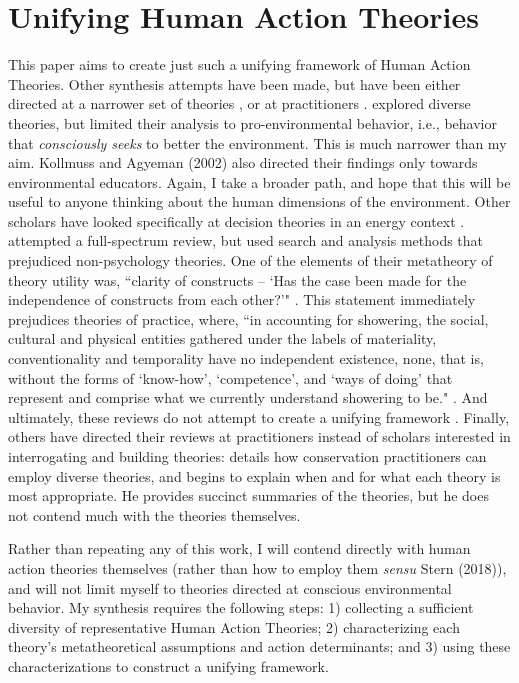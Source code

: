 \documentclass[12 pt]{article}
\begin{document}
\section{Unifying Human Action Theories}
This paper aims to create just such a unifying framework of Human Action Theories. Other synthesis attempts have been made, but have been either directed at a narrower set of theories \parencite[e.g.,][]{Kollmuss2002}, or at practitioners \parencite{Stern2018}. \textcite{Kollmuss2002} explored diverse theories, but limited their analysis to pro-environmental behavior, i.e., behavior that \textit{consciously seeks} to better the environment. This is much narrower than my aim. Kollmuss and Agyeman (2002) also directed their findings only towards environmental educators. Again, I take a broader path, and hope that this will be useful to anyone thinking about the human dimensions of the environment.  Other scholars have looked specifically at decision theories in an energy context \parencite{Wilson2007}.  \textcite{Davis2015} attempted a full-spectrum review, but used search and analysis methods that prejudiced  non-psychology theories. One of the elements of their metatheory of theory utility was, ``clarity of constructs – `Has the case been made for the independence of constructs from each other?'" \parencite[][p. 332]{Davis2015}. This statement immediately prejudices theories of practice, where, ``in accounting for showering, the social, cultural and physical entities gathered under the labels of materiality, conventionality and temporality have no independent existence, none, that is, without the forms of `know-how', `competence', and `ways of doing' that represent and comprise what we currently understand showering to be." \parencite[][unpaginated]{Hand2005}. 
And ultimately, these reviews do not attempt to create a unifying framework \parencite{Davis2015}. Finally, others have directed their reviews at practitioners instead of scholars interested in interrogating and building theories:   \textcite{Stern2018} details how conservation practitioners can employ diverse theories, and begins to explain when and for what each theory is most appropriate. He provides succinct summaries of the theories, but he does not contend much with the theories themselves. 

Rather than repeating any of this work, I will contend directly with human action theories themselves (rather than how to employ them \textit{sensu} Stern (2018)), and will not limit myself to theories directed at conscious environmental behavior. My synthesis requires the following steps: 1) collecting a sufficient diversity of representative Human Action Theories; 2) characterizing each theory's metatheoretical assumptions and action determinants; and 3) using these characterizations to construct a unifying framework. 
\end{document}
